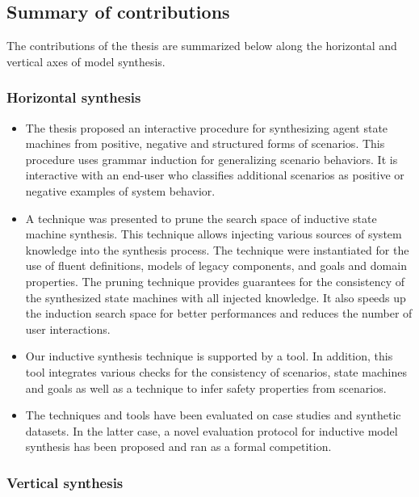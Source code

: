 \subsection*{Summary of contributions\label{section:conclusion-contributions}}

The contributions of the thesis are summarized below along the horizontal and vertical axes of model synthesis.

\subsubsection*{Horizontal synthesis}

\begin{itemize}
\item The thesis proposed an interactive procedure for synthesizing agent state machines from positive, negative and structured forms of scenarios. This procedure uses grammar induction for generalizing scenario behaviors. It is interactive with an end-user who classifies additional scenarios as positive or negative examples of system behavior.
\item A technique was presented to prune the search space of inductive state machine synthesis. This technique allows injecting various sources of system knowledge into the synthesis process. The technique were instantiated for the use of fluent definitions, models of legacy components, and goals and domain properties. The pruning technique provides guarantees for the consistency of the synthesized state machines with all injected knowledge. It also speeds up the induction search space for better performances and reduces the number of user interactions.
\item Our inductive synthesis technique is supported by a tool. In addition, this tool integrates various checks for the consistency of scenarios, state machines and goals as well as a technique to infer safety properties from scenarios. 
\item The techniques and tools have been evaluated on case studies and synthetic datasets. In the latter case, a novel evaluation protocol for inductive model synthesis has been proposed and ran as a formal competition.
\end{itemize}

\subsubsection*{Vertical synthesis}

